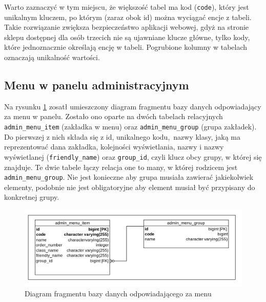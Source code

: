 Warto zaznaczyć w tym miejscu, że większość tabel ma kod (\texttt{code}), który jest unikalnym kluczem, po którym (zaraz obok id) można wyciągać encje z tabeli. Takie rozwiązanie zwiększa bezpieczeństwo aplikacji webowej, gdyż na stronie sklepu dostępnej dla osób trzecich nie są ujawniane klucze główne, tylko kody, które jednoznacznie określają encję w tabeli. Pogrubione kolumny w tabelach oznaczają unikalność wartości. 

\subsection{Menu w panelu administracyjnym}
Na rysunku \ref{db_menu} zosatł umieszczony diagram fragmentu bazy danych odpowiadający za menu w panelu. Zostało ono oparte na dwóch tabelach relacyjnych \texttt{admin\_menu\_item} (zakładka w menu) oraz \texttt{admin\_menu\_group} (grupa zakładek). Do pierwszej z nich składa się z id, unikalnego kodu, nazwy klasy, jaką ma reprezentować dana zakładka, kolejności wyświetlania, nazwy i nazwy wyświetlanej (\texttt{friendly\_name}) oraz \texttt{group\_id}, czyli klucz obcy grupy, w której się znajduje. Te dwie tabele łączy relacja one to many, w której rodzicem jest \texttt{admin\_menu\_group}. Nie jest konieczne aby grupa musiała zawierać jakiekolwiek elementy, podobnie nie jest obligatoryjne aby element musiał być przypisany do konkretnej grupy. 

\begin{figure}
	\begin{center}
		\includegraphics[scale=0.3]{db_menu.png}
	\end{center}
	\caption{{\color{black}Diagram fragmentu bazy danych odpowiadającego za menu}} \label{db_menu}
\end{figure}

